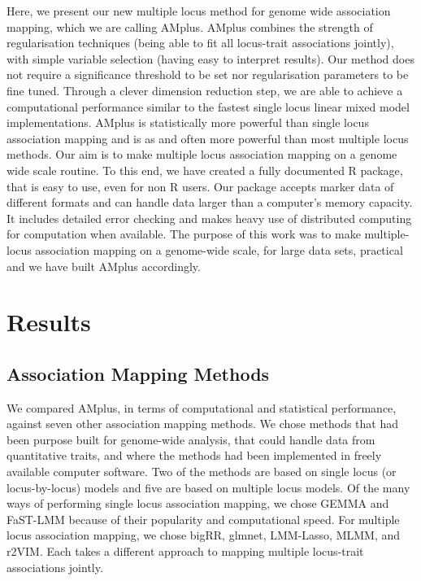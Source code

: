 \documentclass[12pt]{article}
\begin{document}
Here, we present our new multiple locus method for genome wide association mapping, which we are calling AMplus. AMplus combines the strength of regularisation techniques (being able to fit all locus-trait associations jointly), with simple variable selection (having easy to interpret results). Our method does not require a significance threshold to be set nor regularisation parameters to be fine tuned. Through a clever dimension reduction step, we are able to achieve a computational performance similar to the fastest single locus linear mixed model implementations. AMplus is statistically more powerful than single locus association mapping and is as and often more powerful than 
most multiple locus methods. Our aim is to make multiple locus association mapping on a genome wide scale routine. To this end, we have created a fully documented R package, that is easy to use, even for non R users.  Our package accepts marker data of different 
formats and can handle data larger than a computer's  memory capacity. It includes detailed error checking and makes heavy use of 
distributed computing for computation when available.  The purpose of this work was to make multiple-locus association mapping on 
a genome-wide scale, for large data sets,  practical and we have built AMplus accordingly. 


\section{Results}

\subsection{Association Mapping Methods}

We compared AMplus, in terms of computational and statistical performance, against seven other association mapping methods. 
We chose methods that had been purpose built for genome-wide analysis, that could handle data from quantitative traits, and where the methods had been implemented in freely available computer software. Two of the methods are based on single locus (or locus-by-locus) models and five are based on multiple locus models. Of the many ways of performing single locus association mapping, we chose GEMMA and FaST-LMM because of their popularity and computational speed. For multiple locus association mapping, we chose bigRR, glmnet, LMM-Lasso, MLMM, and r2VIM.  Each takes a different approach to mapping multiple locus-trait associations jointly.
\end{document}
